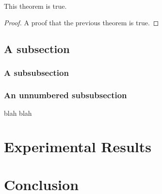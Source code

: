 \documentclass{article}
\begin{document}
\begin{theorem}
This theorem is true.
\end{theorem}

\begin{proof}
A proof that the previous theorem is true.
\end{proof}

\subsection{A subsection}

\subsubsection{A subsubsection}

\subsubsection*{An unnumbered subsubsection} blah blah

\section{Experimental Results}

\section{Conclusion}



\end{document}
